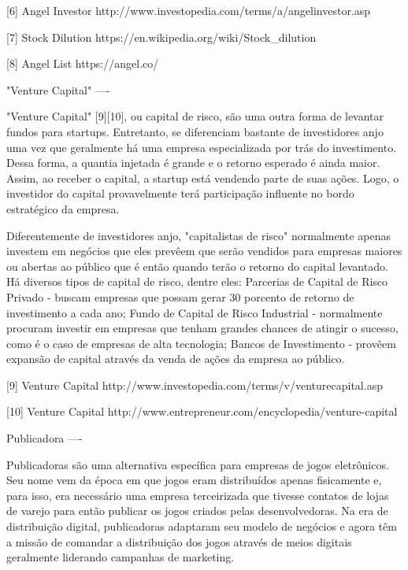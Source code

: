 [6] Angel Investor
http://www.investopedia.com/terms/a/angelinvestor.asp

[7] Stock Dilution
https://en.wikipedia.org/wiki/Stock_dilution

[8] Angel List
https://angel.co/


"Venture Capital"
----

"Venture Capital" [9][10], ou capital de risco, são uma outra forma de levantar fundos para startups. Entretanto, se diferenciam bastante de investidores anjo uma vez que geralmente há uma empresa especializada por trás do investimento. Dessa forma, a quantia injetada é grande e o retorno esperado é ainda maior. Assim, ao receber o capital, a startup está vendendo parte de suas ações. Logo, o investidor do capital provavelmente terá participação influente no bordo estratégico da empresa.

Diferentemente de investidores anjo, "capitalistas de risco" normalmente apenas investem em negócios que eles prevêem que serão vendidos para empresas maiores ou abertas ao público que é então quando terão o retorno do capital levantado. Há diversos tipos de capital de risco, dentre eles: Parcerias de Capital de Risco Privado - buscam empresas que possam gerar 30 porcento de retorno de investimento a cada ano; Fundo de Capital de Risco Industrial - normalmente procuram investir em empresas que tenham grandes chances de atingir o sucesso, como é o caso de empresas de alta tecnologia; Bancos de Investimento - provêem expansão de capital através da venda de ações da empresa ao público.

[9] Venture Capital
http://www.investopedia.com/terms/v/venturecapital.asp

[10] Venture Capital
http://www.entrepreneur.com/encyclopedia/venture-capital


Publicadora
----

Publicadoras são uma alternativa específica para empresas de jogos eletrônicos. Seu nome vem da época em que jogos eram distribuídos apenas fisicamente e, para isso, era necessário uma empresa terceirizada que tivesse contatos de lojas de varejo para então publicar os jogos criados pelas desenvolvedoras. Na era de distribuição digital, publicadoras adaptaram seu modelo de negócios e agora têm a missão de comandar a distribuição dos jogos através de meios digitais geralmente liderando campanhas de marketing.
